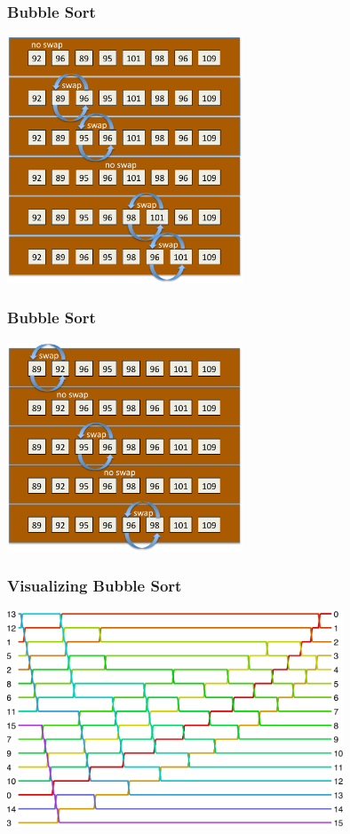 \documentclass{beamer} %
\begin{document}
\begin{frame}
  \frametitle{Bubble Sort}
  \centering
  \includegraphics[width=70mm]{assets/swapping6-cropped.pdf}
\end{frame}
\begin{frame}
  \frametitle{Bubble Sort}
  \centering
  \includegraphics[width=70mm]{assets/swapping7-cropped.pdf}
\end{frame}
\begin{frame}
  \frametitle{Visualizing Bubble Sort}
  \centering
  \includegraphics[width=100mm]{assets/bubblesort.pdf}
\end{frame}
\end{document}
